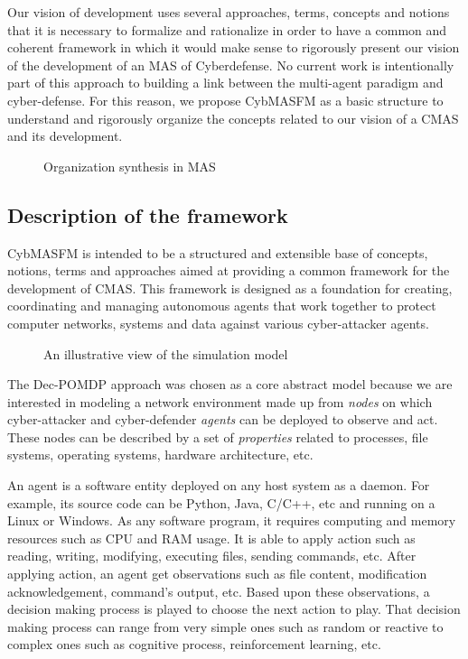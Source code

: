 \documentclass[conference]{IEEEtran}
\begin{document}
Our vision of development uses several approaches, terms, concepts and notions that it is necessary to formalize and rationalize in order to have a common and coherent framework in which it would make sense to rigorously present our vision of the development of an MAS of Cyberdefense. No current work is intentionally part of this approach to building a link between the multi-agent paradigm and cyber-defense. For this reason, we propose CybMASFM as a basic structure to understand and rigorously organize the concepts related to our vision of a CMAS and its development.


\begin{figure*}[]
    \centering
    
    \caption{Organization synthesis in MAS}
    \label{fig:organization_synthesis_illustration}
\end{figure*}


\subsection{Description of the framework}

CybMASFM is intended to be a structured and extensible base of concepts, notions, terms and approaches aimed at providing a common framework for the development of CMAS. This framework is designed as a foundation for creating, coordinating and managing autonomous agents that work together to protect computer networks, systems and data against various cyber-attacker agents.

\begin{figure*}[]
    \centering
    
    \caption{An illustrative view of the simulation model}
    \label{fig:model_example_illustration}
\end{figure*}

The Dec-POMDP approach was chosen as a core abstract model because we are interested in modeling a network environment made up from \textit{nodes} on which cyber-attacker and cyber-defender \textit{agents} can be deployed to observe and act. These nodes can be described by a set of \textit{properties} related to processes, file systems, operating systems, hardware architecture, etc.

An agent is a software entity deployed on any host system as a daemon.
For example, its source code can be Python, Java, C/C++, etc and running on a Linux or Windows.
As any software program, it requires computing and memory resources such as CPU and RAM usage.
It is able to apply action such as reading, writing, modifying, executing files, sending commands, etc.
After applying action, an agent get observations such as file content, modification acknowledgement, command's output, etc.
Based upon these observations, a decision making process is played to choose the next action to play. That decision making process can range from very simple ones such as random or reactive to complex ones such as cognitive process, reinforcement learning, etc.
\end{document}

